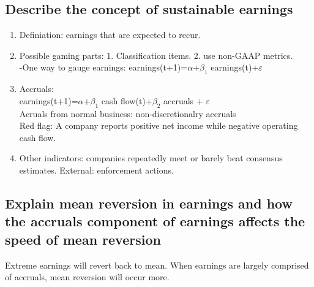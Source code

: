 \documentclass{article}
\newcommand{\be}{\begin{enumerate}}
\newcommand{\ee}{\end{enumerate}}
\begin{document}
\subsection{Describe the concept of sustainable earnings}
\be
    \item Definiation: earnings that are expected to recur.
    \item Possible gaming parts: 1. Classification items. 2. use non-GAAP metrics.
        \\-One way to gauge earnings: earnings(t+1)=$\alpha$+$\beta_1$ earnings(t)+$\varepsilon$
    \item Accruals:
        \\earnings(t+1)=$\alpha$+$\beta_1$ cash flow(t)+$\beta_2$ accruals + $\varepsilon$
        \\Acruals from normal business: non-discretionalry accruals
        \\Red flag: A company reports positive net income while negative operating
        cash flow.
    \item Other indicators: companies repeatedly meet or barely beat consensus estimates.
        External: enforcement actions.
\ee
\subsection{Explain mean reversion in earnings and how the accruals component of earnings
affects the speed of mean reversion}
Extreme earnings will revert back to mean. When earnings are largely comprised
of accruals, mean reversion will occur more.
\end{document}
